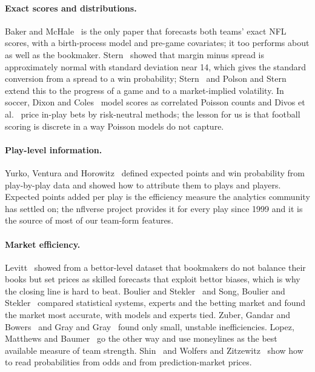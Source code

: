 \paragraph{Exact scores and distributions.} Baker and McHale~\cite{bakermchale2013} is the only paper that forecasts both teams' exact NFL scores, with a birth-process model and pre-game covariates; it too performs about as well as the bookmaker. Stern~\cite{stern1991} showed that margin minus spread is approximately normal with standard deviation near 14, which gives the standard conversion from a spread to a win probability; Stern~\cite{stern1994} and Polson and Stern~\cite{polsonstern2015} extend this to the progress of a game and to a market-implied volatility. In soccer, Dixon and Coles~\cite{dixoncoles1997} model scores as correlated Poisson counts and Divos et al.~\cite{divos2018} price in-play bets by risk-neutral methods; the lesson for us is that football scoring is discrete in a way Poisson models do not capture.

\paragraph{Play-level information.} Yurko, Ventura and Horowitz~\cite{yurko2019} defined expected points and win probability from play-by-play data and showed how to attribute them to plays and players. Expected points added per play is the efficiency measure the analytics community has settled on; the nflverse project provides it for every play since 1999 and it is the source of most of our team-form features.

\paragraph{Market efficiency.} Levitt~\cite{levitt2004} showed from a bettor-level dataset that bookmakers do not balance their books but set prices as skilled forecasts that exploit bettor biases, which is why the closing line is hard to beat. Boulier and Stekler~\cite{boulierstekler2003} and Song, Boulier and Stekler~\cite{songboulierstekler2007} compared statistical systems, experts and the betting market and found the market most accurate, with models and experts tied. Zuber, Gandar and Bowers~\cite{zuber1985} and Gray and Gray~\cite{graygray1997} found only small, unstable inefficiencies. Lopez, Matthews and Baumer~\cite{lopez2018} go the other way and use moneylines as the best available measure of team strength. Shin~\cite{shin1993} and Wolfers and Zitzewitz~\cite{wolferszitzewitz2006} show how to read probabilities from odds and from prediction-market prices.

